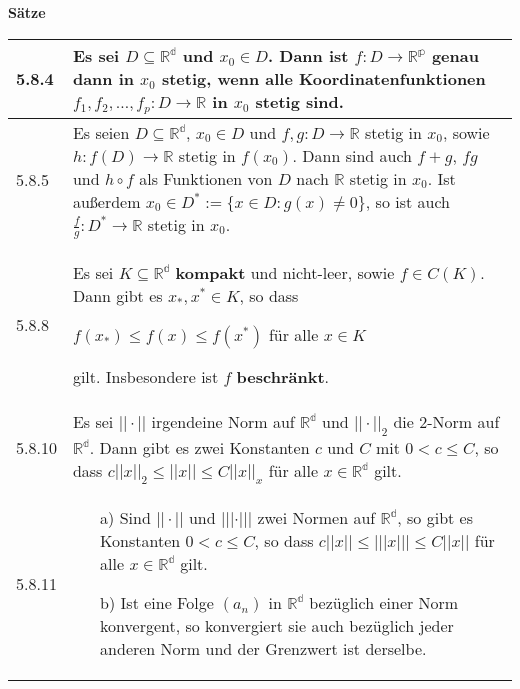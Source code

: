     \noindent 
    \textbf{Sätze}
    \begin{table}[H]
    \begin{tabularx}{\textwidth}{X m{16cm}}
        \toprule

        5.8.4 & Es sei $D \subseteq \mathbb{R^d}$ und $x_0 \in D$. Dann ist $f: D \rightarrow \mathbb{R^p}$ genau dann in $x_0$
                \textbf{stetig}, wenn alle Koordinatenfunktionen $f_1, f_2, \dots, f_p : D \rightarrow \mathbb{R}$ in $x_0$ stetig sind. \\
        \midrule
        5.8.5 &  Es seien $D \subseteq \mathbb{R^d}$, $x_0 \in D$ und $f,g : D \rightarrow \mathbb{R}$ stetig in $x_0$, sowie
                $h : f(D) \rightarrow \mathbb{R}$ stetig in $f(x_0)$. Dann sind auch $f+g$, $fg$ und $h \circ f$ als Funktionen
                von $D$ nach $\mathbb{R}$ stetig in $x_0$. \hfill \break
                Ist au\ss erdem $x_0 \in D^* := \{x \in D: g(x) \neq 0\}$, so ist auch $\frac{f}{g}:D^* \rightarrow \mathbb{R}$ stetig in $x_0$. \\
        \midrule
        5.8.8 & Es sei $K \subseteq \mathbb{R^d}$ \textbf{kompakt} und nicht-leer, sowie $f \in C(K)$. Dann gibt es $x_*, x^* \in K$, so dass \hfill \break
                \centerline{$f(x_*) \leq f(x) \leq f(x^*)$ für alle $x \in K$}
                gilt. Insbesondere ist $f$ \textbf{beschränkt}. \\
        \midrule
        5.8.10& Es sei $||\cdot||$ irgendeine Norm auf $\mathbb{R^d}$ und $||\cdot||_2$ die 2-Norm auf $\mathbb{R^d}$. Dann gibt es zwei Konstanten
                $c$ und $C$ mit $0 < c \leq C$, so dass $c||x||_2  \leq ||x|| \leq C ||x||_x$ für alle $x \in \mathbb{R^d}$ gilt. \\
        \midrule
        5.8.11& \begin{itemize}
                    \item[a)] Sind $||\cdot||$ und $|||\cdot|||$ zwei Normen auf $\mathbb{R^d}$, so gibt es Konstanten $0 < c \leq C$, so dass
                                $c||x|| \leq |||x||| \leq C||x||$ für alle $x \in \mathbb{R^d}$ gilt.
                    \item[b)] Ist eine Folge $(a_n)$ in $\mathbb{R^d}$ bezüglich einer Norm konvergent, so konvergiert sie auch bezüglich  
                                jeder anderen Norm und der Grenzwert ist derselbe. 
                \end{itemize} \\
        \bottomrule
    \end{tabularx}
    \end{table}

